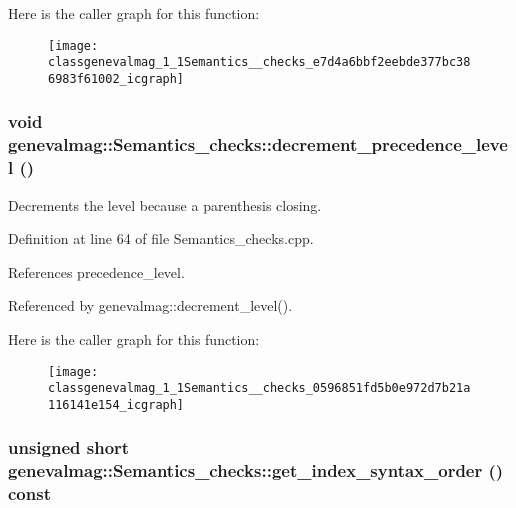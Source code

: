 Here is the caller graph for this function:\nopagebreak
\begin{figure}[H]
\begin{center}
\leavevmode
\texttt{[image: classgenevalmag\_1\_1Semantics\_\_checks\_e7d4a6bbf2eebde377bc386983f61002\_icgraph]}
\end{center}
\end{figure}
\hypertarget{classgenevalmag_1_1Semantics__checks_0596851fd5b0e972d7b21a116141e154}{
\subsubsection[{decrement\_\-precedence\_\-level}]{\setlength{\rightskip}{0pt plus 5cm}void genevalmag::Semantics\_\-checks::decrement\_\-precedence\_\-level ()}}
\label{classgenevalmag_1_1Semantics__checks_0596851fd5b0e972d7b21a116141e154}


Decrements the level because a parenthesis closing. 

Definition at line 64 of file Semantics\_\-checks.cpp.

References precedence\_\-level.

Referenced by genevalmag::decrement\_\-level().

Here is the caller graph for this function:\nopagebreak
\begin{figure}[H]
\begin{center}
\leavevmode
\texttt{[image: classgenevalmag\_1\_1Semantics\_\_checks\_0596851fd5b0e972d7b21a116141e154\_icgraph]}
\end{center}
\end{figure}
\hypertarget{classgenevalmag_1_1Semantics__checks_6d51fcd1f3ed2d6bf5470de0fb5b7770}{
\subsubsection[{get\_\-index\_\-syntax\_\-order}]{\setlength{\rightskip}{0pt plus 5cm}unsigned short genevalmag::Semantics\_\-checks::get\_\-index\_\-syntax\_\-order () const}}
\label{classgenevalmag_1_1Semantics__checks_6d51fcd1f3ed2d6bf5470de0fb5b7770}



